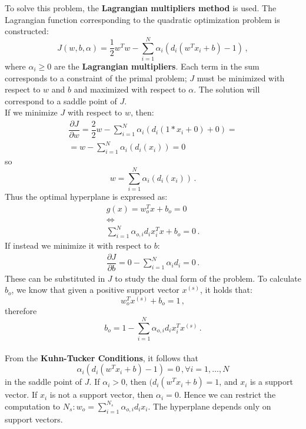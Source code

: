 To solve this problem, the \textbf{Lagrangian multipliers method} is used. The Lagrangian function corresponding to the quadratic optimization problem is constructed:
\begin{equation*}
    J(w,b,\alpha) = \dfrac{1}{2}w^T w - \sum_{i=1}^N \alpha_i(d_i(w^T x_i + b) - 1) \, ,
\end{equation*}
where $\alpha_i \geq 0$ are the \textbf{Lagrangian multipliers}. Each term in the sum corresponds to a constraint of the primal problem; $J$ must be minimized with respect to $w$ and $b$ and maximized with respect to $\alpha$. The solution will correspond to a saddle point of $J$. \\
If we minimize $J$ with respect to $w$, then:
\begin{gather*}
    \dfrac{\partial J}{\partial w} = \dfrac{2}{2} w - \sum_{i=1}^N \alpha_i(d_i(1*x_i + 0) + 0) = \\
    = w - \sum_{i=1}^N \alpha_i(d_i(x_i)) = 0
\end{gather*}
so
\begin{equation*}
    w = \sum_{i=1}^N \alpha_i(d_i(x_i)) \, .
\end{equation*}
Thus the optimal hyperplane is expressed as:
\begin{gather*}
    g(x) = w_o^T x + b_o = 0 \\
    \iff \\
    \sum_{i=1}^N \alpha_{o,i} d_i x_i^T x + b_o = 0 \, .
\end{gather*}
If instead we minimize it with respect to $b$:
\begin{gather*}
    \dfrac{\partial J}{\partial b} = 0 - \sum_{i=1}^N \alpha_i d_i = 0 \, .
\end{gather*}
These can be substituted in $J$ to study the dual form of the problem.
To calculate $b_o$, we know that given a positive support vector $x^{(s)}$, it holds that:
\begin{equation*}
    w_o^T x^{(s)} + b_o = 1 \, ,
\end{equation*}
therefore
\begin{equation*}
    b_o = 1 - \sum_{i=1}^N \alpha_{o,i} d_i x_i^T x^{(s)} \, .
\end{equation*}
\\
From the \textbf{Kuhn-Tucker Conditions}, it follows that
\begin{equation*}
    \alpha_i (d_i (w^T x_i + b) - 1) = 0 \, , \forall i = 1, \dots , N
\end{equation*}
in the saddle point of $J$. If $\alpha_i > 0$, then $(d_i (w^T x_i + b) = 1$, and $x_i$ is a support vector. If $x_i$ is not a support vector, then $\alpha_i = 0$. Hence we can restrict the computation to $N_s : w_o = \sum_{i=1}^{N_s} \alpha_{o,i} d_i x_i$. The hyperplane depends only on support vectors.

